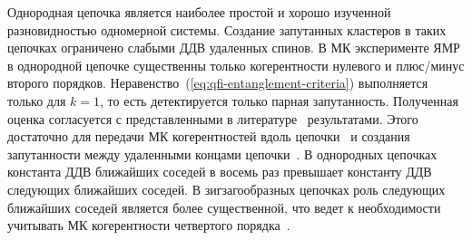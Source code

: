 Однородная цепочка является наиболее простой и хорошо изученной разновидностью одномерной системы.
Создание запутанных кластеров в таких цепочках ограничено слабыми ДДВ удаленных спинов.
В МК эксперименте ЯМР в однородной цепочке существенны только когерентности нулевого и плюс/минус второго порядков. Неравенство~(\ref{eq:qfi-entanglement-criteria}) выполняется только для $k = 1$, то есть детектируется только парная запутанность.
Полученная оценка согласуется с представленными в литературе~\cite{Doronin2007, Feldman2012} результатами.
Этого достаточно для передачи МК когерентностей вдоль цепочки~\cite{Bochkin2018qip, Feldman2021, Zhukov2019, Bochkin2022} и создания запутанности между удаленными концами цепочки~\cite{Lazarev2019}.
В однородных цепочках константа ДДВ ближайших соседей
в восемь раз превышает константу ДДВ следующих ближайших соседей. В зигзагообразных цепочках
роль следующих ближайших соседей является более существенной, что ведет к необходимости учитывать
МК когерентности четвертого порядка~\cite{Bochkin2019}.


